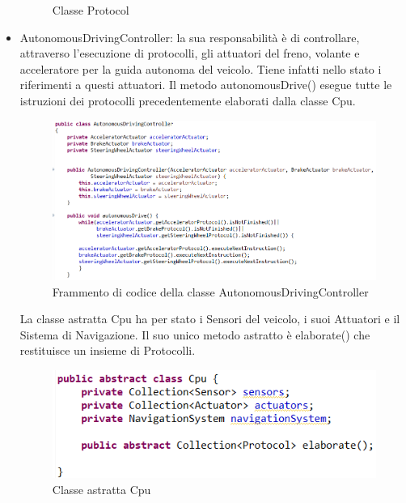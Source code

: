 \documentclass{article}
\begin{document}
\begin{itemize}
\begin{figure} [H]
\begin{center}
\end{center}
\caption{Classe Protocol}
\end{figure}


\item AutonomousDrivingController: la sua responsabilità è di controllare, attraverso l'esecuzione di protocolli, gli attuatori del freno, volante e acceleratore per la guida autonoma del veicolo. Tiene infatti nello stato i riferimenti a questi attuatori. Il metodo autonomousDrive() esegue tutte le istruzioni dei protocolli precedentemente elaborati dalla classe Cpu. 

\begin{figure} [H]
\begin{center}
\includegraphics[scale=0.8]{AutonomousDrivingController.png}
\end{center}
\caption{Frammento di codice della classe AutonomousDrivingController}
\end{figure}
La classe astratta Cpu ha per stato i Sensori del veicolo, i suoi Attuatori e il Sistema di Navigazione. Il suo unico metodo astratto è elaborate() che restituisce un insieme di Protocolli.
\begin{figure} [H]
\begin{center}
\includegraphics[scale=0.8]{Cpu.png}
\end{center}
\caption{Classe astratta Cpu}
\end{figure}


\end{itemize}
\end{document}
